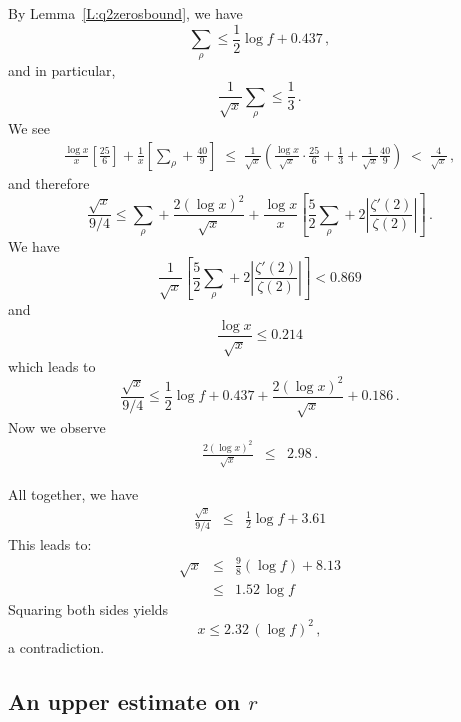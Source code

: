 \documentclass{amsart}
\numberwithin{equation}{section}
\numberwithin{table}{section}
\begin{document}
By Lemma~\ref{L:q2zerosbound},
we have
$$
  \sum_\rho\leq
  \frac{1}{2}
  \log f
  +0.437
  
  \,,
$$
and in particular,
$$
  \frac{1}{\sqrt{x}}\sum_\rho\leq
  \frac{1}{3}
  \,.
$$
We see
\begin{eqnarray*}
  \frac{\log x}{x}
  \left[
  \frac{25}{6}
  \right]
  +
  \frac{1}{x}
  \left[
  \sum_\rho
  +
  \frac{40}{9}
  \right]
  \;\leq\;
  \frac{1}{\sqrt{x}}
  \left(
        \frac{\log x}{\sqrt{x}}
  \cdot
  \frac{25}{6}
  +
  \frac{1}{3}
  +
  \frac{1}{\sqrt{x}}
  \frac{40}{9}
  \right)
  \;<\;
  \frac{4}{\sqrt{x}}
  \,,
\end{eqnarray*}
and therefore
$$
  \frac{\sqrt{x}}{9/4}
  \leq
  
  \sum_\rho
  +
  \frac{2(\log x)^2}{\sqrt{x}}
  +
  \frac{\log x}{x}
  \left[
  \frac{5}{2}\sum_\rho+2
  \left|\frac{\zeta'(2)}{\zeta(2)}\right|
  \right]
  \,.
$$
We have
$$
  \frac{1}{\sqrt{x}}\left[
  \frac{5}{2}\sum_\rho
  +
  2\left|\frac{\zeta'(2)}{\zeta(2)}\right|
  \right]
  <
  0.869
$$
and
$$
\frac{\log x}{\sqrt{x}}
\leq
0.214
$$
which leads to
$$
  \frac{\sqrt{x}}{9/4}
  \leq
    \frac{1}{2}
    \log f
    +
    0.437
  +
  \frac{2(\log x)^2}{\sqrt{x}}
  +
  0.186
  \,.
$$
Now we observe
\begin{eqnarray*}
  \frac{2(\log x)^2}{\sqrt{x}}
  &\leq&
  2.98
  \,.
\end{eqnarray*}

All together, we have
\begin{eqnarray*}
  \frac{\sqrt{x}}{9/4}
  &\leq&
      \frac{1}{2}
      \log f
      +3.61
\end{eqnarray*}
This leads to:
\begin{eqnarray*}
  \sqrt{x}
  &\leq&
  \frac{9}{8}(\log f)
  +
  8.13
  \\
  &\leq&
  1.52\,\log f
\end{eqnarray*}
Squaring both sides yields
$$
  x\leq 2.32\,(\log f)^2
  \,,
$$  
a contradiction.
{\raisebox{-.25ex}{\scalebox{.786}[1.272]{$\blacksquare$}}}

\subsection{An upper estimate on $r$}\label{S:GRH.nonresidues.r}
\end{document}
